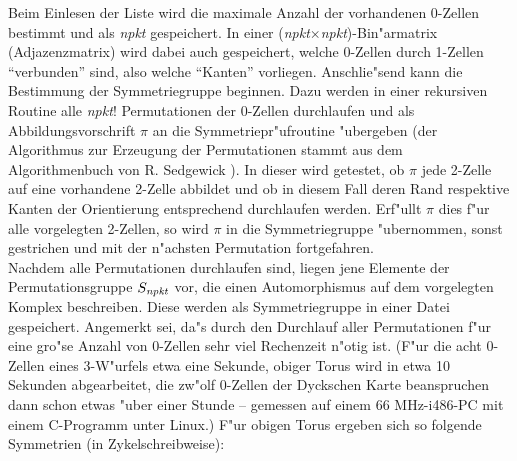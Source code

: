Beim Einlesen der Liste wird die maximale Anzahl der vorhandenen 0-Zellen
bestimmt und als {\it npkt} gespeichert. In einer
({\it npkt}$\times${\it npkt})-Bin"armatrix (Adjazenzmatrix) wird dabei auch
gespeichert, welche 0-Zellen durch 1-Zellen "`verbunden"' sind, also welche
"`Kanten"' vorliegen. Anschlie"send kann die Bestimmung der Symmetriegruppe
beginnen. Dazu werden in einer rekursiven Routine alle {\it npkt}! Permutationen
der 0-Zellen durchlaufen und als Abbildungsvorschrift $\pi$ an die
Symmetriepr"ufroutine "ubergeben (der Algorithmus zur Erzeugung der
Permutationen stammt aus dem Algorithmenbuch von R. Sedgewick \cite{Sed:91}).
In dieser wird getestet, ob $\pi$ jede 2-Zelle auf eine vorhandene
2-Zelle abbildet und ob in diesem Fall deren Rand respektive Kanten der
Orientierung entsprechend durchlaufen werden. Erf"ullt $\pi$ dies f"ur alle
vorgelegten 2-Zellen, so wird $\pi$ in die Symmetriegruppe "ubernommen, sonst
gestrichen und mit der n"achsten Permutation fortgefahren.\\
Nachdem alle Permutationen durchlaufen sind, liegen jene Elemente der
Permutationsgruppe $S_{\it npkt}$ vor, die einen Automorphismus auf dem
vorgelegten Komplex beschreiben. Diese werden als Symmetriegruppe in einer
Datei gespeichert. Angemerkt sei, da"s durch den Durchlauf aller Permutationen
f"ur eine gro"se Anzahl von 0-Zellen sehr viel Rechenzeit n"otig ist.
{\scsi
(F"ur die acht 0-Zellen eines 3-W"urfels etwa eine Sekunde, obiger Torus wird
in etwa 10 Sekunden abgearbeitet, die zw"olf 0-Zellen der Dyckschen Karte
beanspruchen dann schon etwas "uber einer Stunde -- gemessen auf einem
66 MHz-i486-PC mit einem C-Programm unter Linux.)} F"ur obigen Torus ergeben
sich so folgende Symmetrien (in Zykelschreibweise):
